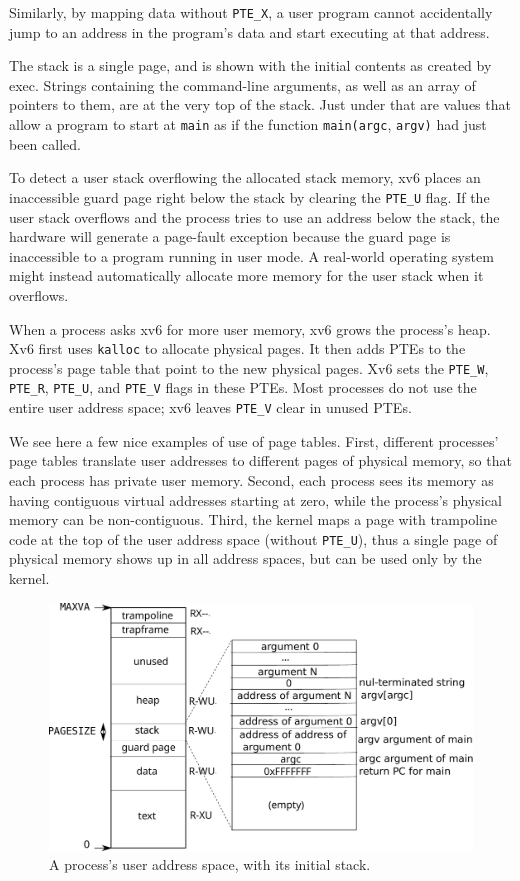 Similarly, by mapping data without \lstinline{PTE_X}, a user program
cannot accidentally jump to an address in the program's data and start
executing at that address.

The stack is a single page, and is shown with the initial contents as
created by exec.  Strings containing the command-line arguments, as
well as an array of pointers to them, are at the very top of the
stack.  Just under that are values that allow a program to start at
\lstinline{main} as if the function \lstinline{main(argc},
\lstinline{argv)} had just been called.

To detect a user stack overflowing the allocated stack memory, xv6
places an inaccessible guard page right below the stack by clearing
the \lstinline{PTE_U} flag. If the user stack overflows and the
process tries to use an address below the stack, the hardware will
generate a page-fault exception because the guard page is inaccessible
to a program running in user mode. A real-world operating system might
instead automatically allocate more memory for the user stack when it
overflows.

When a process asks xv6 for more user memory, xv6 grows the process's
heap. Xv6 first uses {\tt kalloc} to allocate physical pages.
It then adds PTEs to the process's page table that point
to the new physical pages.
Xv6 sets the
\lstinline{PTE_W},
\lstinline{PTE_R},
\lstinline{PTE_U},
and
\lstinline{PTE_V}
flags in these PTEs.
Most processes do not use the entire user address space;
xv6 leaves
\lstinline{PTE_V}
clear in unused PTEs.

We see here a few nice examples of use of page tables.  First,
different processes' page tables translate user addresses to different
pages of physical memory, so that each process has private user
memory.  Second, each process sees its memory as having contiguous
virtual addresses starting at zero, while the process's physical
memory can be non-contiguous.  Third, the kernel maps a page with
trampoline code at the top of the user address space (without
\lstinline{PTE_U}), thus a single page of physical memory shows up in
all address spaces, but can be used only by the kernel.

\begin{figure}[t]
\center
\includegraphics[scale=0.5]{fig/processlayout.pdf}
\caption{A process's user address space, with its initial stack.}
\label{fig:processlayout}
\end{figure}

